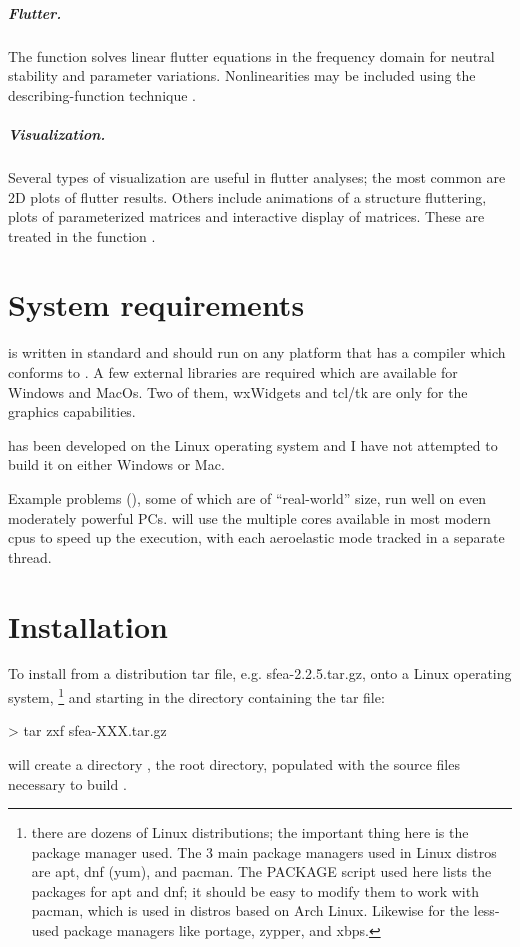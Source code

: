 \subparagraph{Flutter.}
The  function solves linear flutter equations
in the frequency domain for neutral stability and parameter
variations.
Nonlinearities may be included using the describing-function
technique .
        
\subparagraph{Visualization.}
Several types of visualization are useful in flutter analyses;
the most common are 2D plots of flutter results.
Others include animations of a structure fluttering, plots of
parameterized matrices and interactive display of matrices.
These are treated in the  function .
        
\section{System requirements}
\Flaps is written in standard \Cpp and should run on any platform
that has a \Cpp compiler which conforms to . A few external libraries
are required which are available for Windows and MacOs.
Two of them, wxWidgets and tcl/tk are only for the graphics capabilities.

\Flaps has been developed on the Linux operating system and I
have not attempted to build it on either Windows or Mac.

Example problems (),
some of which are of ``real-world'' size, run well on even moderately
powerful PCs.  \flaps will use the multiple cores available
in most modern cpus to speed up the execution, with each aeroelastic
mode tracked in a separate thread.

\section{Installation}\label{sect:installation}
To install \Flaps from a distribution tar file, e.g.
sfea-2.2.5.tar.gz, onto a Linux operating system,
\footnote{there are dozens of Linux distributions; the important thing here is
the package manager used. The 3 main package managers used in Linux
distros are apt, dnf (yum), and pacman. The PACKAGE script used here
lists the packages for apt and dnf; it should be easy to modify them
to work with pacman, which is used in distros based on Arch Linux.
Likewise for the less-used package managers like portage, zypper, and xbps.}
and starting in the directory containing the tar file:
\begin{example}
>  tar zxf sfea-XXX.tar.gz
\end{example}
will create a directory , the \Flaps root directory,
populated with the source files necessary to build \Flaps.

